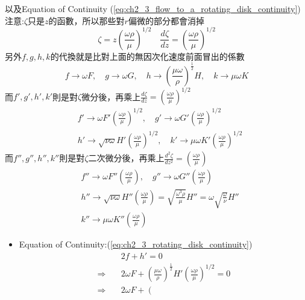 \documentclass[../main.tex]{subfiles}
\begin{document}
\begin{itemize}
\begin{enumerate}
    以及Equation of Continuity (\ref{eq:ch2_3_flow_to_a_rotating_disk_continuity})\\
    注意:$\zeta$只是$z$的函數，所以那些對$r$偏微的部分都會消掉
    \begin{equation}
      \zeta = z \left(\frac{\omega \rho}{\mu}\right)^{1/2} \quad \frac{d\zeta}{dz} = \left(\frac{\omega \rho}{\mu}\right)^{1/2}
    \end{equation}
    另外$f,g,h,k$的代換就是比對上面的無因次化速度前面冒出的係數
    \begin{equation}
      f \to \omega F, \quad g \to \omega G, \quad h \to \left(
            \frac{\mu \omega}{\rho}
          \right)^{\frac{1}{2}} H, \quad k \to \mu \omega K
    \end{equation}
    而$f',g',h',k'$則是對$\zeta$微分後，再乘上$\frac{d\zeta}{dz} = \left(\frac{\omega \rho}{\mu}\right)^{1/2}$
    \begin{align}
      &f' \to \omega F' \left(\frac{\omega \rho}{\mu}\right)^{1/2}, \quad
      g' \to \omega G' \left(\frac{\omega \rho}{\mu}\right)^{1/2} \nonumber\\
      &h' \to \sqrt{\nu \omega} H' \left(\frac{\omega \rho}{\mu}\right)^{1/2}, \quad
      k' \to \mu \omega K' \left(\frac{\omega \rho}{\mu}\right)^{1/2}
    \end{align}
    而$f'',g'',h'',k''$則是對$\zeta$二次微分後，再乘上$\frac{d^2\zeta}{dz^2} = \left(\frac{\omega \rho}{\mu}\right)$
    \begin{align}
      &f'' \to \omega F'' \left(\frac{\omega \rho}{\mu}\right), \quad
      g'' \to \omega G'' \left(\frac{\omega \rho}{\mu}\right) \nonumber\\
      &h'' \to \sqrt{\nu \omega} H'' \left(\frac{\omega \rho}{\mu}\right) = 
      \sqrt{\frac{ \omega^3\rho}{\mu}} H'' = \omega\sqrt{\frac{\omega}{\nu}} H''\nonumber\\
      &k'' \to \mu \omega K'' \left(\frac{\omega \rho}{\mu}\right)
    \end{align}
    \begin{itemize}
      \item Equation of Continuity:(\ref{eq:ch2_3_rotating_disk_continuity})
      \begin{align}
        & 2 f + h' = 0 \nonumber\\
        \Rightarrow \quad & 2 \omega F + \left(
            \frac{\mu \omega}{\rho}
          \right)^{\frac{1}{2}} H' \left(\frac{\omega \rho}{\mu}\right)^{1/2} = 0 \nonumber\\
        \Rightarrow \quad & 2 \omega F + \left(

\end{align}
\end{itemize}
\end{enumerate}
\end{itemize}
\end{document}
